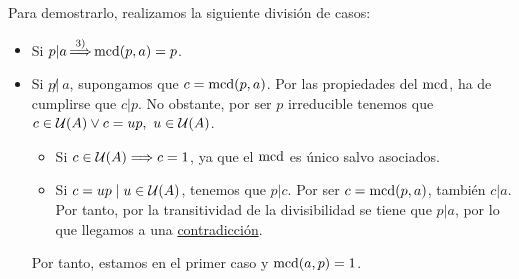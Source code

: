 \begin{enumerate}
    Para demostrarlo, realizamos la siguiente división de casos:
    \begin{itemize}
        \item Si $\displaystyle p|a \mathop{\Longrightarrow}^{3)} \operatorname{mcd}(p,a)=p$.

        \item Si  $p\not|~a$, supongamos que $c=\operatorname{mcd}(p,a)$. Por las propiedades del $\operatorname{mcd}$, ha de cumplirse que $c|p$. No obstante, por ser $p$ irreducible tenemos que $c\in \mathcal{U}(A)\lor c=up,~u\in \mathcal{U}(A)$.
        \begin{itemize}
            \item Si $c\in \mathcal{U}(A)\Longrightarrow c=1$, ya que el $\operatorname{mcd}$ es único salvo asociados.
            \item Si $c=up\mid u\in \mathcal{U}(A)$, tenemos que $p|c$. Por ser $c=\operatorname{mcd}(p,a)$, también $c|a$. Por tanto, por la transitividad de la divisibilidad se tiene que $p|a$, por lo que llegamos a una \ul{contradicción}.
        \end{itemize}
        Por tanto, estamos en el primer caso y $\operatorname{mcd}(a,p)=1$.
    \end{itemize}
\end{enumerate}

